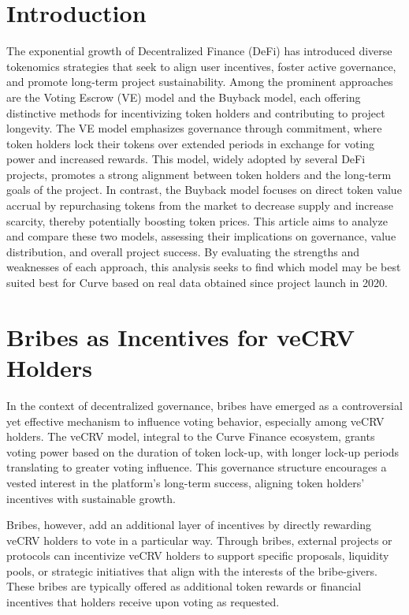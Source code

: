 \documentclass[notitlepage]{revtex4-2}
\begin{document}
\section{Introduction}
The exponential growth of Decentralized Finance (DeFi) has introduced diverse tokenomics strategies that seek to align
user incentives, foster active governance, and promote long-term project sustainability. Among the prominent approaches
are the Voting Escrow (VE) model and the Buyback model, each offering distinctive methods for incentivizing token
holders and contributing to project longevity.
The VE model emphasizes governance through commitment, where token holders lock their tokens over extended periods in
exchange for voting power and increased rewards. This model, widely adopted by several DeFi projects,
promotes a strong alignment between token holders and the long-term goals of the project. In contrast, the Buyback
model focuses on direct token value accrual by repurchasing tokens from the market to decrease supply and increase
scarcity, thereby potentially boosting token prices.
This article aims to analyze and compare these two models, assessing their implications on governance, value
distribution, and overall project success. By evaluating the strengths and weaknesses of each approach, this analysis
seeks to find which model may be best suited best for Curve based on real data obtained since project launch in 2020.

\section{Bribes as Incentives for veCRV Holders}

In the context of decentralized governance, bribes have emerged as a controversial yet effective mechanism to influence
voting behavior, especially among veCRV holders. The veCRV model, integral to the Curve Finance ecosystem, grants
voting power based on the duration of token lock-up, with longer lock-up periods translating to greater voting
influence. This governance structure encourages a vested interest in the platform’s long-term success, aligning token
holders' incentives with sustainable growth.

Bribes, however, add an additional layer of incentives by directly rewarding veCRV holders to vote in a particular way.
Through bribes, external projects or protocols can incentivize veCRV holders to support specific proposals,
liquidity pools, or strategic initiatives that align with the interests of the bribe-givers. These bribes are typically
offered as additional token rewards or financial incentives that holders receive upon voting as requested.
\end{document}
